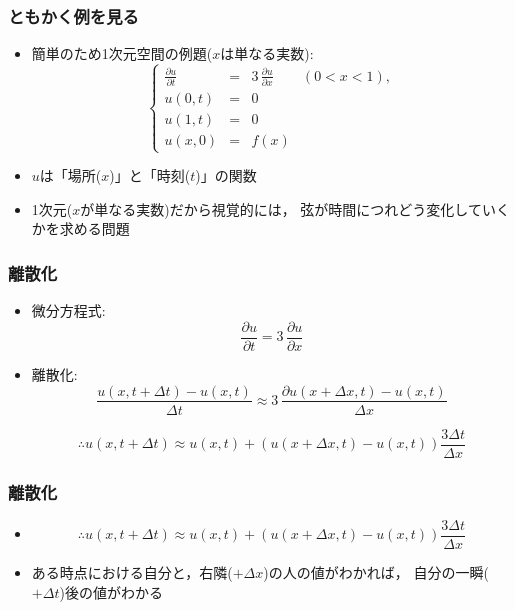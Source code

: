 \documentclass[12pt,dvipdfmx]{beamer}
\begin{document}
\begin{frame}
\frametitle{ともかく例を見る}
\begin{itemize}
\item [] 簡単のため1次元空間の例題($x$は単なる実数): 
\[\left\{
  \begin{array}{rcll}
{\displaystyle
\frac{\partial u}{\partial t}} & = & 3\, {\displaystyle \frac{\partial u}{\partial x}} & (0 < x < 1), \\
u(0, t) & = & 0 \\
u(1, t) & = & 0 \\
u(x, 0) & = & f(x)
  \end{array}\right.
\]

\item $u$は「場所($x$)」と「時刻($t$)」の関数

\item 1次元($x$が単なる実数)だから視覚的には，
弦が時間につれどう変化していくかを求める問題

\begin{center}
\def\svgwidth{\textwidth}

\end{center}
\end{itemize}
\end{frame}


\begin{frame}
\frametitle{離散化}
\begin{itemize}
\item 微分方程式:
\[ \frac{\partial u}{\partial t} = 3\, \frac{\partial u}{\partial x} \]

\item 離散化:
\[ \frac{u(x,t+\Delta t)-u(x,t)}{\Delta t} \approx 
3\, \frac{\partial u(x+\Delta x, t) - u(x, t)}{\Delta x} \]

\[ \therefore
u(x,t+\Delta t) \approx 
u(x,t) + (u(x+\Delta x, t) - u(x, t)) \frac{3\Delta t}{\Delta x} \]

\end{itemize}
\end{frame}

\begin{frame}
\frametitle{離散化}
\begin{itemize}
\item []
\[ \therefore
u(x,t+\Delta t) \approx 
u(x,t) + (u(x+\Delta x, t) - u(x, t)) \frac{3\Delta t}{\Delta x} \]

\begin{center}
\def\svgwidth{0.6\textwidth}

\end{center}

\item ある時点における自分と，右隣($+\Delta x$)の人の値がわかれば，
  自分の一瞬($+\Delta t$)後の値がわかる
\end{itemize}
\end{frame}
\end{document}
